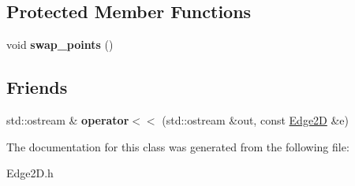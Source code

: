 \subsection*{Protected Member Functions}
\begin{DoxyCompactItemize}
\item 
void {\bfseries swap\+\_\+points} ()\hypertarget{classcmst_1_1_edge2_d_aeb88dc66750f6c7967de0918e906abf4}{}\label{classcmst_1_1_edge2_d_aeb88dc66750f6c7967de0918e906abf4}

\end{DoxyCompactItemize}
\subsection*{Friends}
\begin{DoxyCompactItemize}
\item 
std\+::ostream \& {\bfseries operator$<$$<$} (std\+::ostream \&out, const \hyperlink{classcmst_1_1_edge2_d}{Edge2D} \&e)\hypertarget{classcmst_1_1_edge2_d_ae312c205375d240b1c8bc889f2c1c55e}{}\label{classcmst_1_1_edge2_d_ae312c205375d240b1c8bc889f2c1c55e}

\end{DoxyCompactItemize}


The documentation for this class was generated from the following file\+:\begin{DoxyCompactItemize}
\item 
Edge2\+D.\+h\end{DoxyCompactItemize}
